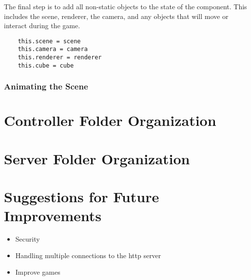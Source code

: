 \documentclass{article}
\begin{document}
	The final step is to add all non-static objects to the state of the component. This includes the scene, renderer, the camera, and any objects that will move or interact during the game. 
	
	\begin{verbatim}
	this.scene = scene
	this.camera = camera
	this.renderer = renderer
	this.cube = cube
	\end{verbatim}
	
		\subsubsection{Animating the Scene}
	


\section{Controller Folder Organization}
\section{Server Folder Organization}

\section{Suggestions for Future Improvements}
	\begin{itemize}
		\item Security
		\item Handling multiple connections to the http server
		\item Improve games
	\end{itemize}
\end{document}
